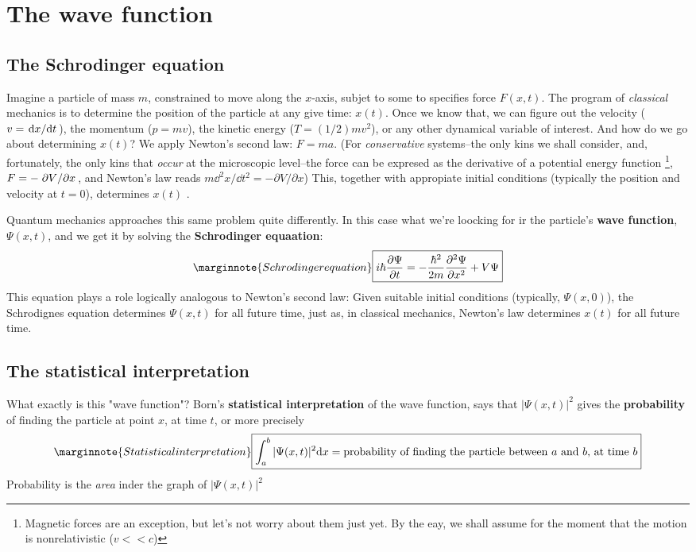 \chapter{The wave function}
\section{The Schrodinger equation}
Imagine a particle of mass $m$, constrained to move along the $x$-axis, subjet to some to specifies force $F(x,t)$. The program of \textit{classical} mechanics is to determine the position of the particle at any give time: $x(t)$. Once we know that, we can figure out the velocity ($v=\dv*{x}{t}$), the momentum ($p=mv$), the kinetic energy ($T=(1/2)mv^2$), or any other dynamical variable of interest. And how do we go about determining $x(t)$? We apply Newton's second law: $F=ma$. (For \textit{conservative} systems--the only kins we shall consider, and, fortunately, the only kins that \textit{occur} at the microscopic level--the force can be expresed as the derivative of a potential energy function \footnote{Magnetic forces are an exception, but let's not worry about them just yet. By the eay, we shall assume for the moment that the motion is nonrelativistic ($v<<c$)}, $F=-\pdv*{V}{x}$, and Newton's law reads $m\dd ^2x/\dd t^2=-\partial V/\partial x$) This, together with appropiate initial conditions (typically the position and velocity at $t=0$), determines $x(t)$ .

Quantum mechanics approaches this same problem quite differently. In this case what we're loocking for ir the particle's \textbf{wave function}, $\Psi(x,t)$, and we get it by solving the \textbf{Schrodinger equaation}:
\begin{equation}\label{1.1}\marginnote{Schrodinger equation}
	\boxed{i\hbar\pdv{\Psi}{t}=-\frac{\hbar^2}{2m}\pdv[2]{\Psi}{x}+V\Psi}
\end{equation}
This equation plays a role logically analogous to Newton's second law: Given suitable initial conditions (typically, $\Psi(x,0)$), the Schrodignes equation determines $\Psi(x,t)$ for all future time, just as, in classical mechanics, Newton's law determines $x(t)$ for all future time.

\section{The statistical interpretation}
What exactly is this "wave function"? Born's \textbf{statistical interpretation} of the wave function, says that $|\Psi(x,t)|^2 $ gives the \textbf{probability} of finding the particle at point $x$, at time $t$, or more precisely
\begin{equation}\label{1.3}\marginnote{Statistical interpretation}
	\boxed{\int_a^b|\Psi(x,t)|^2\dd x=\mbox{probability of finding the particle  between $a$ and $b$, at time $b$}}
\end{equation}
Probability is the \textit{area} inder the graph of $|\Psi(x,t)|^2$

